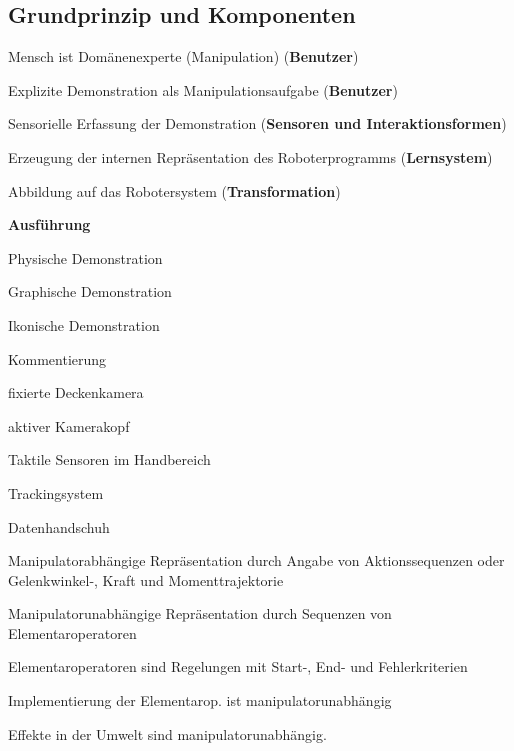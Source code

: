 \subsection{Grundprinzip und Komponenten}
\begin{compactitem}
    \item Mensch ist Domänenexperte (Manipulation) (\textbf{Benutzer})
    \item Explizite Demonstration als Manipulationsaufgabe (\textbf{Benutzer})
    \item Sensorielle Erfassung der Demonstration (\textbf{Sensoren und Interaktionsformen})
    \item Erzeugung der internen Repräsentation des Roboterprogramms (\textbf{Lernsystem})
    \item Abbildung auf das Robotersystem (\textbf{Transformation})
    \item \textbf{Ausführung}
\end{compactitem}

\begin{compactitem}
    \item Physische Demonstration
    \item Graphische Demonstration
    \item Ikonische Demonstration
    \item Kommentierung
\end{compactitem}
\begin{compactitem}
    \item fixierte Deckenkamera
    \item aktiver Kamerakopf
    \item Taktile Sensoren im Handbereich
    \item Trackingsystem
    \item Datenhandschuh
\end{compactitem}

\begin{compactitem}
    \item Manipulatorabhängige Repräsentation durch Angabe von Aktionssequenzen oder Gelenkwinkel-,
    Kraft und Momenttrajektorie
    \item Manipulatorunabhängige Repräsentation durch Sequenzen von Elementaroperatoren
    \begin{compactitem}
        \item Elementaroperatoren sind Regelungen mit Start-, End- und Fehlerkriterien
        \item Implementierung der Elementarop. ist manipulatorunabhängig
        \item Effekte in der Umwelt sind manipulatorunabhängig.
    \end{compactitem}
\end{compactitem}

